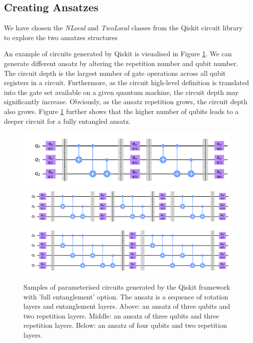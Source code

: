 \subsection{Creating Ansatzes}
We have chosen the \textit{NLocal} and \textit{TwoLocal} classes from the Qiskit circuit library to explore the two ansatzes structures

An example of circuits generated by Qiskit is visualised in Figure \ref{Ansatz samples}.
We can generate different ansatz by altering the repetition number and qubit number.
The circuit depth is the largest number of gate operations across all qubit registers in a circuit.
Furthermore, as the circuit high-level definition is translated into the gate set available on a given quantum machine, the circuit depth may significantly increase.
Obviously, as the ansatz repetition grows, the circuit depth also grows.
Figure \ref{Ansatz samples} further shows that the higher number of qubits leads to a deeper circuit for a fully entangled ansatz.

\begin{figure}
    \includegraphics[width=\textwidth]{Artefact/Appendices/ansatz3-2.png}
    \includegraphics[width=\textwidth]{Artefact/Appendices/ansatz3-3.png}
    \includegraphics[width=\textwidth]{Artefact/Appendices/ansatz4-2.png}
    \caption{
        Samples of parameterised circuits generated by the Qiskit framework with 'full entanglement' option.
        The ansatz is a sequence of rotation layers and entanglement layers.
        Above: an ansatz of three qubits and two repetition layers.
        Middle: an ansatz of three qubits and three repetition layers.
        Below: an ansatz of four qubits and two repetition layers.
    }
    \label{Ansatz samples}
\end{figure}
